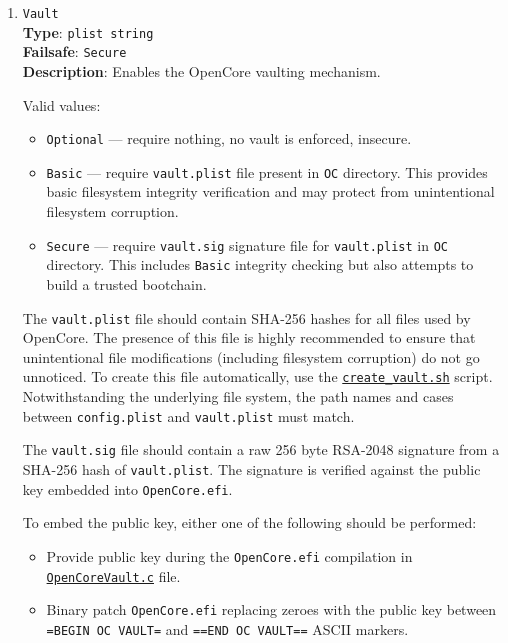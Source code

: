 \documentclass[]{article}
\makeatletter
\providecommand{\tightlist}{%
  \setlength{\itemsep}{0pt}\setlength{\parskip}{0pt}}
\renewcommand{\label}[1]{%
\zref@wrapper@immediate{\oldlabel{#1}}}  %
\makeatother
\begin{document}
\begin{enumerate}
\item \label{securevaulting}
  \texttt{Vault}\\
  \textbf{Type}: \texttt{plist\ string}\\
  \textbf{Failsafe}: \texttt{Secure}\\
  \textbf{Description}: Enables the OpenCore vaulting mechanism.

  Valid values:

  \begin{itemize}
  \tightlist
  \item \texttt{Optional} --- require nothing, no vault is enforced, insecure.
  \item \texttt{Basic} --- require \texttt{vault.plist} file present
  in \texttt{OC} directory. This provides basic filesystem integrity
  verification and may protect from unintentional filesystem corruption.
  \item \texttt{Secure} --- require \texttt{vault.sig} signature file for
  \texttt{vault.plist} in \texttt{OC} directory. This includes \texttt{Basic}
  integrity checking but also attempts to build a trusted bootchain.
  \end{itemize}

  The \texttt{vault.plist} file should contain SHA-256 hashes for all files used by OpenCore.
  The presence of this file is highly recommended to ensure that unintentional file modifications
  (including filesystem corruption) do not go unnoticed. To create this file automatically, use the
  \href{https://github.com/acidanthera/OpenCorePkg/tree/master/Utilities/CreateVault}{\texttt{create\_vault.sh}}
  script. Notwithstanding the underlying file system, the path names and cases between \texttt{config.plist}
  and \texttt{vault.plist} must match.

  The \texttt{vault.sig} file should contain a raw 256 byte RSA-2048 signature from a SHA-256
  hash of \texttt{vault.plist}. The signature is verified against the public key embedded
  into \texttt{OpenCore.efi}.

  To embed the public key, either one of the following should be performed:

  \begin{itemize}
  \tightlist
  \item Provide public key during the \texttt{OpenCore.efi} compilation in
  \href{https://github.com/acidanthera/OpenCorePkg/blob/master/Platform/OpenCore/OpenCoreVault.c}{\texttt{OpenCoreVault.c}} file.
  \item Binary patch \texttt{OpenCore.efi} replacing zeroes with the public key
  between \texttt{=BEGIN OC VAULT=} and \texttt{==END OC VAULT==} ASCII markers.
  \end{itemize}


\end{enumerate}
\end{document}
